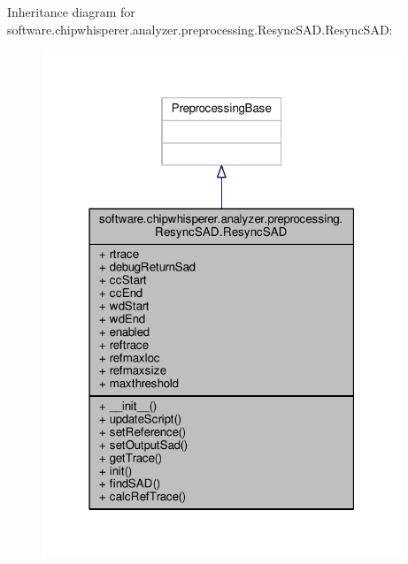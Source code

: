 Inheritance diagram for software.\+chipwhisperer.\+analyzer.\+preprocessing.\+Resync\+S\+A\+D.\+Resync\+S\+A\+D\+:\nopagebreak
\begin{figure}[H]
\begin{center}
\leavevmode
\includegraphics[width=304pt]{d8/d31/classsoftware_1_1chipwhisperer_1_1analyzer_1_1preprocessing_1_1ResyncSAD_1_1ResyncSAD__inherit__graph}
\end{center}
\end{figure}


